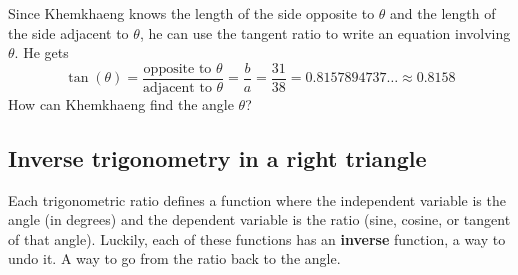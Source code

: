 \begin{center}
\end{center}

Since Khemkhaeng knows the length of the side opposite to $\theta$ and the length of the side adjacent to $\theta$, he can use the tangent ratio to write an equation involving $\theta$.  He gets
$$\tan(\theta) = \frac{\text{opposite to } \theta}{\text{adjacent to } \theta} = \frac{b}{a} = \frac{31}{38} = 0.8157894737\ldots \approx 0.8158$$
How can Khemkhaeng find the angle $\theta$?

\subsection*{Inverse trigonometry in a right triangle}

Each trigonometric ratio defines a function where the independent variable is the angle (in degrees) and the dependent variable is the ratio (sine, cosine, or tangent of that angle).  Luckily, each of these functions has an \textbf{inverse} function, a way to undo it. A way to go from the ratio back to the angle.


